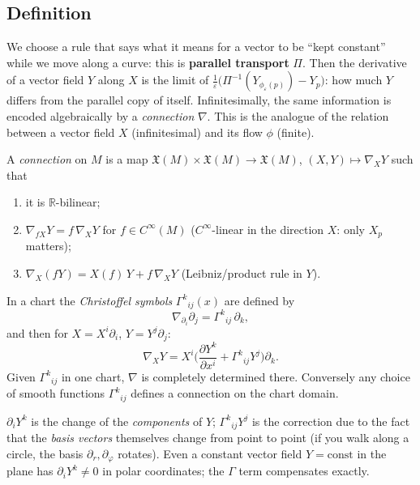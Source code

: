 \documentclass[11pt,a4paper]{article}
\numberwithin{equation}{section}
\theoremstyle{definition}
\theoremstyle{plain}
\newcommand{\R}{\mathbb{R}}
\newcommand{\Xfield}{\mathfrak{X}}
\begin{document}
\subsection{Definition}
\begin{intuition}[{derivative = ``compare with the parallel copy''}]
We choose a rule that says what it means for a vector to be ``kept constant'' while we move along a curve: this is \textbf{parallel transport} $\Pi$. Then the derivative of a vector field $Y$ along $X$ is the limit of $\frac1\varepsilon\big(\Pi^{-1}(Y_{\phi_\varepsilon(p)})-Y_p\big)$: how much $Y$ differs from the parallel copy of itself. Infinitesimally, the same information is encoded algebraically by a \emph{connection} $\nabla$. This is the analogue of the relation between a vector field $X$ (infinitesimal) and its flow $\phi$ (finite).
\end{intuition}
\begin{formal}
A \emph{connection} on $M$ is a map $\Xfield(M)\times\Xfield(M)\to\Xfield(M)$, $(X,Y)\mapsto\nabla_XY$ such that
\begin{enumerate}[label=(\roman*),nosep]
\item it is $\R$-bilinear;
\item $\nabla_{fX}Y=f\,\nabla_XY$ for $f\in C^\infty(M)$ ($C^\infty$-linear in the direction $X$: only $X_p$ matters);
\item $\nabla_X(fY)=X(f)\,Y+f\,\nabla_XY$ (Leibniz/product rule in $Y$).
\end{enumerate}
In a chart the \emph{Christoffel symbols} $\Gamma^k{}_{ij}(x)$ are defined by
\[
\nabla_{\partial_i}\partial_j=\Gamma^k{}_{ij}\,\partial_k ,
\]
and then for $X=X^i\partial_i$, $Y=Y^j\partial_j$:
\begin{equation}\label{eq:covdev}
\nabla_XY=X^i\Big(\frac{\partial Y^k}{\partial x^i}+\Gamma^k{}_{ij}Y^j\Big)\partial_k .
\end{equation}
Given $\Gamma^k{}_{ij}$ in one chart, $\nabla$ is completely determined there. Conversely any choice of smooth functions $\Gamma^k{}_{ij}$ defines a connection on the chart domain.
\end{formal}
\begin{intuition}[{Christoffel symbols = correction terms}]
$\partial_iY^k$ is the change of the \emph{components} of $Y$; $\Gamma^k{}_{ij}Y^j$ is the correction due to the fact that the \emph{basis vectors} themselves change from point to point (if you walk along a circle, the basis $\partial_r,\partial_\varphi$ rotates). Even a constant vector field $Y=\mathrm{const}$ in the plane has $\partial_iY^k\neq0$ in polar coordinates; the $\Gamma$ term compensates exactly.
\end{intuition}
\end{document}
